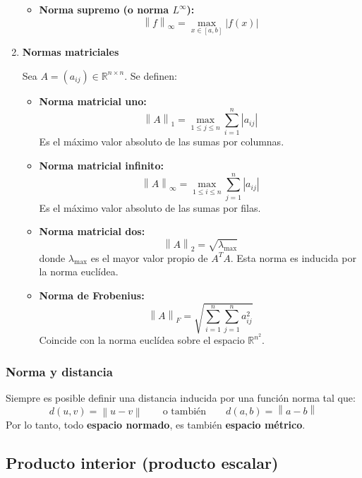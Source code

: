 \begin{enumerate}
\begin{itemize}
    \item \textbf{Norma supremo (o norma \(L^\infty\)):}
    \[
      \left\lVert f \right\rVert_\infty = \max_{x \in [a,b]} |f(x)|
    \]
  \end{itemize}

  \item \textbf{Normas matriciales}

  Sea \(A = (a_{ij}) \in \mathbb{R}^{n \times n}\). Se definen:

  \begin{itemize}
    \item \textbf{Norma matricial uno:}
    \[
      \left\lVert A \right\rVert_1 = \max_{1 \leq j \leq n} \sum_{i=1}^{n} |a_{ij}|
    \]
    Es el máximo valor absoluto de las sumas por columnas.

    \item \textbf{Norma matricial infinito:}
    \[
      \left\lVert A \right\rVert_\infty = \max_{1 \leq i \leq n} \sum_{j=1}^{n} |a_{ij}|
    \]
    Es el máximo valor absoluto de las sumas por filas.

    \item \textbf{Norma matricial dos:}
    \[
      \left\lVert A \right\rVert_2 = \sqrt{ \lambda_{\max} }
    \]
    donde \(\lambda_{\max}\) es el mayor valor propio de \(A^T A\). Esta norma es inducida por la norma euclídea.

    \item \textbf{Norma de Frobenius:}
    \[
      \left\lVert A \right\rVert_F = \sqrt{ \sum_{i=1}^{n} \sum_{j=1}^{n} a_{ij}^2 }
    \]
    Coincide con la norma euclídea sobre el espacio \(\mathbb{R}^{n^2}\).
  \end{itemize}

\end{enumerate}

\subsubsection{Norma y distancia}

Siempre es posible definir una distancia inducida por una función norma tal que:
\[
  d(u,v) = \left\lVert u-v\right\rVert \qquad \text{o también} \qquad d(a,b) = \left\lVert a-b \right\rVert
\]
Por lo tanto, todo \textbf{espacio normado}, es también \textbf{espacio métrico}.

\subsection{Producto interior (producto escalar)}

